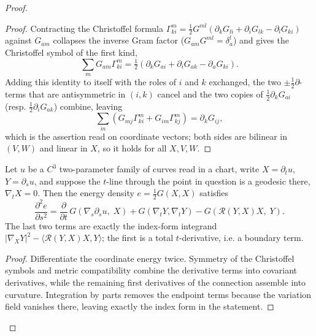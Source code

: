 \begin{proof}
\begin{proof}
\sketch
\leanok
Contracting the Christoffel formula
$\Gamma^m_{ki}=\tfrac12 G^{ml}(\partial_kG_{li}+\partial_iG_{lk}-\partial_lG_{ki})$
against $G_{am}$ collapses the inverse Gram factor ($G_{am}G^{ml}=\delta_a^l$) and
gives the Christoffel symbol of the first kind,
$$\textstyle\sum_m G_{am}\Gamma^m_{ki}
=\tfrac12\left(\partial_kG_{ai}+\partial_iG_{ak}-\partial_aG_{ki}\right).$$
Adding this identity to itself with the roles of $i$ and $k$ exchanged, the two
$\pm\tfrac12\partial$-terms that are antisymmetric in $(i,k)$ cancel and the two
copies of $\tfrac12\partial_kG_{ai}$ (resp. $\tfrac12\partial_iG_{ak}$) combine, leaving
$$\textstyle\sum_m\left(G_{mj}\Gamma^m_{ki}+G_{im}\Gamma^m_{kj}\right)=\partial_kG_{ij},$$
which is the assertion read on coordinate vectors; both sides are bilinear in
$(V,W)$ and linear in $X$, so it holds for all $X,V,W$.
\end{proof}

\begin{lemma}
\label{lem:second-variation-energy-chart}
\leanok



Let $u$ be a $C^3$ two-parameter family of curves read in a chart, write
$X=\partial_t u$, $Y=\partial_s u$, and suppose the $t$-line through the point in
question is a geodesic there, $\nabla_tX=0$.  Then the energy density
$e=\tfrac12 G(X,X)$ satisfies
$$\frac{\partial^2 e}{\partial s^2}
=\frac{\partial}{\partial t}\,G\!\left(\nabla_s\partial_s u,\;X\right)
+G(\nabla_tY,\nabla_tY)-G\!\left({\mathcal R}(Y,X)X,\;Y\right).$$
The last two terms are exactly the index-form integrand $|\nabla_XY|^2-\langle
{\mathcal R}(Y,X)X,Y\rangle$; the first is a total $t$-derivative, i.e. a boundary
term.
\end{lemma}

\begin{proof}
\sketch
{}
\leanok
Differentiate the coordinate energy twice. Symmetry of the Christoffel symbols and metric compatibility combine the derivative terms into covariant derivatives, while the remaining first derivatives of the connection assemble into curvature. Integration by parts removes the endpoint terms because the variation field vanishes there, leaving exactly the index form in the statement.
\end{proof}


\end{proof}
